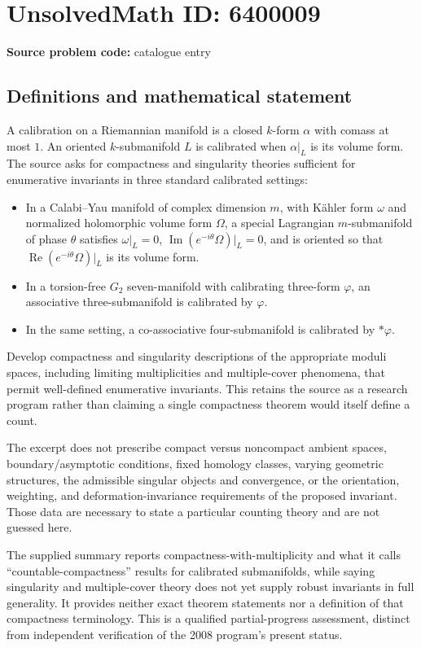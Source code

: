 \documentclass[11pt]{article}
\begin{document}
\section*{UnsolvedMath ID: 6400009}
\textbf{Source problem code:} catalogue entry
\subsection{Definitions and mathematical statement}
A calibration on a Riemannian manifold is a closed \(k\)-form \(\alpha\) with comass at most \(1\). An oriented \(k\)-submanifold \(L\) is calibrated when \(\alpha|_L\) is its volume form. The source asks for compactness and singularity theories sufficient for enumerative invariants in three standard calibrated settings:
\begin{itemize}
\item In a Calabi--Yau manifold of complex dimension \(m\), with K\"ahler form \(\omega\) and normalized holomorphic volume form \(\Omega\), a special Lagrangian \(m\)-submanifold of phase \(\theta\) satisfies \(\omega|_L=0\), \(\operatorname{Im}(e^{-i\theta}\Omega)|_L=0\), and is oriented so that \(\operatorname{Re}(e^{-i\theta}\Omega)|_L\) is its volume form.
\item In a torsion-free \(G_2\) seven-manifold with calibrating three-form \(\varphi\), an associative three-submanifold is calibrated by \(\varphi\).
\item In the same setting, a co-associative four-submanifold is calibrated by \(*\varphi\).
\end{itemize}
Develop compactness and singularity descriptions of the appropriate moduli spaces, including limiting multiplicities and multiple-cover phenomena, that permit well-defined enumerative invariants. This retains the source as a research program rather than claiming a single compactness theorem would itself define a count.

The excerpt does not prescribe compact versus noncompact ambient spaces, boundary/asymptotic conditions, fixed homology classes, varying geometric structures, the admissible singular objects and convergence, or the orientation, weighting, and deformation-invariance requirements of the proposed invariant. Those data are necessary to state a particular counting theory and are not guessed here.

The supplied summary reports compactness-with-multiplicity and what it calls ``countable-compactness'' results for calibrated submanifolds, while saying singularity and multiple-cover theory does not yet supply robust invariants in full generality. It provides neither exact theorem statements nor a definition of that compactness terminology. This is a qualified partial-progress assessment, distinct from independent verification of the 2008 program's present status.
\end{document}
